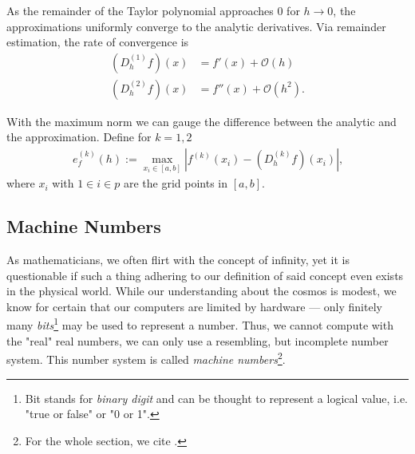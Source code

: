 As the remainder of the Taylor polynomial approaches \(0\) for \(h \rightarrow 0\), the approximations uniformly converge to the analytic derivatives. Via remainder estimation, the rate of convergence is
\begin{align*}
    (D^{(1)}_h f) (x) &= f'(x) + \mathcal{O}(h) \\
    (D^{(2)}_h f) (x) &= f''(x) + \mathcal{O}(h^2) \text{.}
\end{align*}

\noindent With the maximum norm we can gauge the difference between the analytic and the approximation. Define for \(k = 1, 2\)
\begin{align*}
    e^{(k)}_f (h) := \max_{x_i \in [a, b]} \left| f^{(k)} (x_i) - (D^{(k)}_h f) (x_i)\right| \text{,}
\end{align*}
where \(x_i\) with \(1 \in i \in p\) are the grid points in \([a, b]\).

\subsection{Machine Numbers}\label{cha:machine}\label{cha:prec}

As mathematicians, we often flirt with the concept of infinity, yet it is questionable if such a thing adhering to our definition of said concept even exists in the physical world. While our understanding about the cosmos is modest, we know for certain that our computers are limited by hardware --- only finitely many \textit{bits}\footnote{Bit stands for \textit{binary digit} and can be thought to represent a logical value, i.e. "true or false" or "0 or 1".} may be used to represent a number. Thus, we cannot compute with the "real" real numbers, we can only use a resembling, but incomplete number system. This number system is called \textit{machine numbers}\footnote{For the whole section, we cite \cite{EWR}.}.

